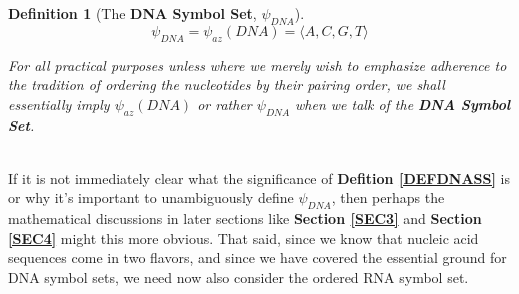 \documentclass[a4paper, 18pt]{article} %
\newtheorem{defn}{Definition}
\begin{document}
{\begin{minipage}{0.9\textwidth}
\begin{defn}[The \textbf{DNA Symbol Set}, $\psi_{DNA}$]
\begin{equation}
\label{EQDNASS}
\psi_{DNA} = \psi_{az}(DNA) = \langle A, C, G, T\rangle
\end{equation}

For all practical purposes unless where we merely wish to emphasize adherence to the tradition of ordering the nucleotides by their pairing order, we shall essentially imply $\psi_{az}(DNA)$ or rather $\psi_{DNA}$ when we talk of the \textbf{DNA Symbol Set}.

\end{defn}

\end{minipage}}
\\

If it is not immediately clear what the significance of \textbf{Defition \ref{DEFDNASS}} is or why it's important to unambiguously define $\psi_{DNA}$, then perhaps the mathematical discussions in later sections like \textbf{Section \ref{SEC3}} and \textbf{Section \ref{SEC4}} might this more obvious. That said, since we know that nucleic acid sequences come in two flavors\cite{wikipedia_nucleic_acid}, and since we have covered the essential ground for DNA symbol sets, we need now also consider the ordered RNA symbol set.\\
\end{document}
